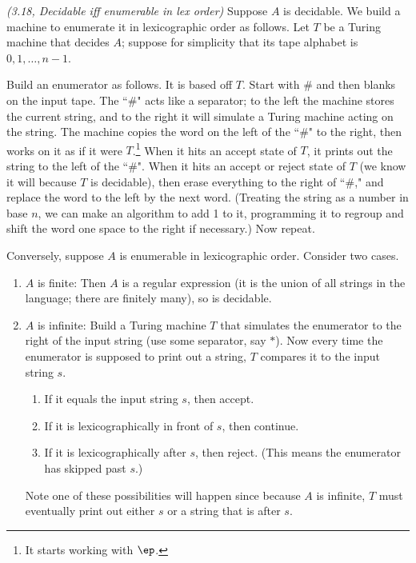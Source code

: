 \begin{problem}{\it (3.18, Decidable iff enumerable in lex order)}
Suppose $A$ is decidable. We build a machine to enumerate it in lexicographic order as follows. Let $T$ be a Turing machine that decides $A$; suppose for simplicity that its tape alphabet is $0,1,\ldots, n-1$.

Build an enumerator as follows. It is based off $T$. Start with $\#$ and then blanks on the input tape. The ``$\#$" acts like a separator; to the left the machine stores the current string, and to the right it will simulate a Turing machine acting on the string. The machine copies the word on the left of the ``$\#$" to the right, then works on it as if it were $T$.\footnote{It starts working with $\ep$.} When it hits an accept state of $T$, it prints out the string to the left of the ``$\#$". When it hits an accept or reject state of $T$ (we know it will because $T$ is decidable), then erase everything to the right of ``$\#$," and replace the word to the left by the next word. (Treating the string as a number in base $n$, we can make an algorithm to add 1 to it, programming it to regroup and shift the word one space to the right if necessary.) Now repeat.

Conversely, suppose $A$ is enumerable in lexicographic order. Consider two cases.
\begin{enumerate}
\item
$A$ is finite: Then $A$ is a regular expression (it is the union of all strings in the language; there are finitely many), so is decidable.
\item
$A$ is infinite: Build a Turing machine $T$ that simulates the enumerator to the right of the input string (use some separator, say $*$). Now every time the enumerator is supposed to print out a string, $T$ compares it to the input string $s$.
\begin{enumerate}
\item
If it equals the input string $s$, then accept.
\item
If it is lexicographically in front of $s$, then continue.
\item
If it is lexicographically after $s$, then reject. (This means the enumerator has skipped past $s$.)
\end{enumerate}
Note one of these possibilities will happen since because $A$ is infinite, $T$ must eventually print out either $s$ or a string that is after $s$.
\end{enumerate}
\end{problem}

